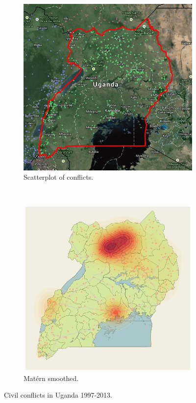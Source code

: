 \documentclass[a0,final]{a0poster}
\begin{document}
\begin{multicols}{3}
\begin{figure}[H]
\centering
  \begin{subfigure}[b]{0.48\columnwidth}
    \centering
    \includegraphics[width=\textwidth]{../write-up/figures/uganda}
    \caption{Scatterplot of conflicts.}
    \label{fig:map-points}
  \end{subfigure}~\begin{subfigure}[b]{0.49\columnwidth}
    \centering
    \includegraphics[width=\textwidth]{../write-up/figures/map-with-smoothed-data}
    \caption{Mat\'{e}rn smoothed.}
    \label{fig:map-smooth}
  \end{subfigure}
  \caption{Civil conflicts in Uganda 1997-2013.}
  \label{fig:map}
\end{figure}


\end{multicols}
\end{document}
